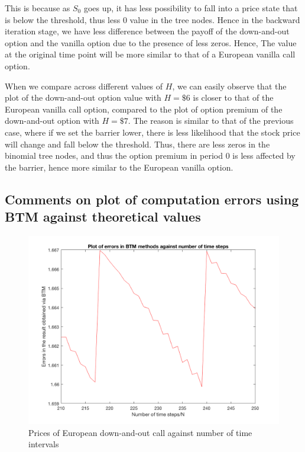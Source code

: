 This is because as $S_0$ goes up, it has less possibility to fall into a price state that is below the threshold, thus less 0 value in the tree nodes. Hence in the backward iteration stage, we have less difference between the payoff of the down-and-out option and the vanilla option due to the presence of less zeros. Hence, The value at the original time point will be more similar to that of a European vanilla call option.

When we compare across different values of $H$, we can easily observe that the plot of the down-and-out option value with $H=\$6$ is closer to that of the European vanilla call option, compared to the plot of option premium of the down-and-out option with $H = \$7$. The reason is similar to that of the previous case, where if we set the barrier lower, there is less likelihood that the stock price will change and fall below the threshold. Thus, there are less zeros in the binomial tree nodes, and thus the option premium in period 0 is less affected by the barrier, hence more similar to the European vanilla option.

\subsection{Comments on plot of computation errors using BTM against theoretical values}

\begin{figure}
	\centering
	\includegraphics[scale=0.3]{A1_4_plot.PNG}
	\caption{Prices of European down-and-out call against number of time intervals}
\end{figure}

